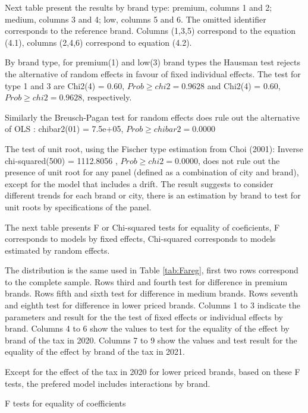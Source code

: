 \documentclass[]{article}
\begin{document}


Next table present the results by brand type: premium, columns 1 and 2; medium, columns 3 and 4; low, columns 5 and 6. The omitted identifier corresponds to the reference brand. Columns (1,3,5) correspond to the equation (4.1), columns (2,4,6) correspond to equation (4.2). 



By brand type, for premium(1) and low(3) brand types the Hausman test rejects the alternative of random effects in favour of fixed individual effects. The test for type 1 and 3 are Chi2(4) =  0.60,
$Prob \geq chi2 =    0.9628$ and Chi2(4) =  0.60,
$Prob \geq chi2 =    0.9628$, respectively.

Similarly the Breusch-Pagan test for random effects does rule out the alternative of OLS : chibar2(01) =  7.5e+05,
$Prob \geq chibar2 =    0.0000$

The test of unit root, using the Fischer type estimation from Choi (2001): 
Inverse chi-squared(500) = 1112.8056 , $Prob \geq chi2 =    0.0000$, does not rule out the presence of unit root for any panel (defined as a combination of city and brand), except for the model that includes a drift. The result suggests to consider different trends for each brand or city, there is an estimation by brand to test for unit roots by specifications of the panel.

The next table presents F or Chi-squared tests for equality of coeficients, F corresponds to models by fixed effects, Chi-squared corresponds to models estimated by random effects.

The distribution is the same used in Table \ref{tab:Fareg}, first two rows correspond to the complete sample. Rows third and fourth test for difference in premium brands. Rows fifth and sixth test for difference in medium brands. Rows seventh and eighth test for difference in lower priced brands.
Columns 1 to 3 indicate the parameters and result for the the test of fixed effects or individual effects by brand. Columns 4 to 6 show the values to test for the equality of the effect by brand of the tax in 2020. Columns 7 to 9 show the values and test result for the equality of the effect by brand of the tax in 2021.

Except for the effect of the tax in 2020 for lower priced brands, based on these F tests, the prefered model includes interactions by brand.

\begin{landscape}
	\begin{table}[ht]
		\centering
		\caption{F tests for equality of coefficients \label{tab:Fxtreg}} 
	
	\end{table}
\end{landscape}
%	
\end{document}
